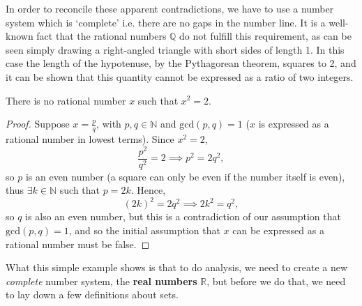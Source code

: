 \documentclass[../real_analysis.tex]{subfiles}
\begin{document}
        In order to reconcile these apparent contradictions, we have to use a number system which is `complete' i.e. there are no gaps in the number line.
        It is a well-known fact that the rational numbers $\mathbb{Q}$ do not fulfill this requirement, as can be seen simply drawing a right-angled triangle with short sides of length 1.
        In this case the length of the hypotenuse, by the Pythagorean theorem, squares to 2, and it can be shown that this quantity cannot be expressed as a ratio of two integers.
        \begin{theorem}
            There is no rational number $x$ such that $x^2=2$.
        \end{theorem}
        \begin{proof}
            Suppose $x=\frac{p}{q}$, with $p,q\in\mathbb{N}$ and $\mathrm{gcd}(p, q)=1$ ($x$ is expressed as a rational number in lowest terms).
            Since $x^2=2$,
            \begin{equation}
                \frac{p^2}{q^2}=2\implies p^2=2q^2,
            \end{equation}
            so $p$ is an even number (a square can only be even if the number itself is even), thus $\exists k\in\mathbb{N}$ such that $p=2k$.
            Hence,
            \begin{equation}
                (2k)^2=2q^2\implies 2k^2=q^2,
            \end{equation}
            so $q$ is also an even number, but this is a contradiction of our assumption that $\mathrm{gcd}(p,q)=1$, and so the initial assumption that $x$ can be expressed as a rational number must be false.
        \end{proof}
        What this simple example shows is that to do analysis, we need to create a new \textit{complete} number system, the \textbf{real numbers} $\mathbb{R}$, but before we do that, we need to lay down a few definitions about sets.
\end{document}
